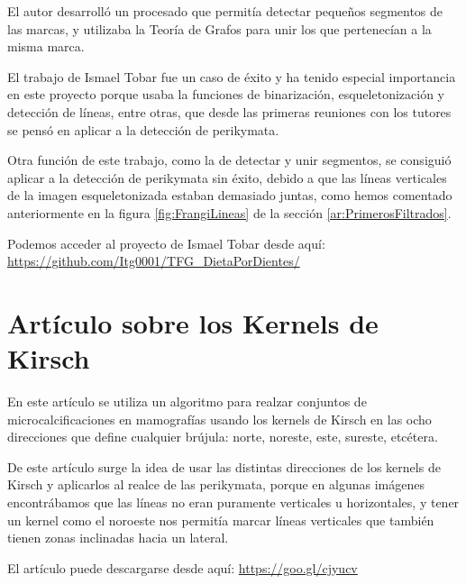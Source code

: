 El autor desarrolló un procesado que permitía detectar pequeños segmentos de las marcas, y utilizaba la Teoría de Grafos \cite{wiki:TeoriaGrafos} para unir los que pertenecían a la misma marca.

El trabajo de Ismael Tobar fue un caso de éxito y ha tenido especial importancia en este proyecto porque usaba la funciones de binarización, esqueletonización y detección de líneas, entre otras, que desde las primeras reuniones con los tutores se pensó en aplicar a la detección de perikymata. 

Otra función de este trabajo, como la de detectar y unir segmentos, se consiguió aplicar a la detección de perikymata sin éxito, debido a que las líneas verticales de la imagen esqueletonizada estaban demasiado juntas, como hemos comentado anteriormente en la figura \ref{fig:FrangiLineas} de la sección \ref{ar:PrimerosFiltrados}.

Podemos acceder al proyecto de Ismael Tobar desde aquí:\\ \url{https://github.com/Itg0001/TFG_DietaPorDientes/}

\section{Artículo sobre los Kernels de Kirsch}
\label{articulosKirsch}
En este artículo \cite{scholar:venmathi2016kirsch} se utiliza un algoritmo para realzar conjuntos de microcalcificaciones en mamografías usando los kernels de Kirsch en las ocho direcciones que define cualquier brújula: norte, noreste, este, sureste, etcétera.

De este artículo surge la idea de usar las distintas direcciones de los kernels de Kirsch y aplicarlos al realce de las perikymata, porque en algunas imágenes encontrábamos que las líneas no eran puramente verticales u horizontales, y tener un kernel como el noroeste nos permitía marcar líneas verticales que también tienen zonas inclinadas hacia un lateral.

El artículo puede descargarse desde aquí: \url{https://goo.gl/cjyucv}